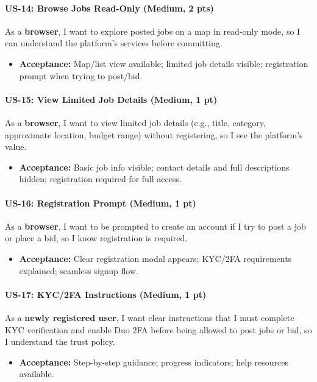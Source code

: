 \documentclass[11pt]{article}
\begin{document}
\paragraph{US-14: Browse Jobs Read-Only (Medium, 2 pts)}
As a \textbf{browser}, I want to explore posted jobs on a map in read-only mode, so I can understand the platform's services before committing.
\begin{itemize}[leftmargin=1.4em]
  \item \textbf{Acceptance:} Map/list view available; limited job details visible; registration prompt when trying to post/bid.
\end{itemize}

\paragraph{US-15: View Limited Job Details (Medium, 1 pt)}
As a \textbf{browser}, I want to view limited job details (e.g., title, category, approximate location, budget range) without registering, so I see the platform's value.
\begin{itemize}[leftmargin=1.4em]
  \item \textbf{Acceptance:} Basic job info visible; contact details and full descriptions hidden; registration required for full access.
\end{itemize}

\paragraph{US-16: Registration Prompt (Medium, 1 pt)}
As a \textbf{browser}, I want to be prompted to create an account if I try to post a job or place a bid, so I know registration is required.
\begin{itemize}[leftmargin=1.4em]
  \item \textbf{Acceptance:} Clear registration modal appears; KYC/2FA requirements explained; seamless signup flow.
\end{itemize}

\paragraph{US-17: KYC/2FA Instructions (Medium, 1 pt)}
As a \textbf{newly registered user}, I want clear instructions that I must complete KYC verification and enable Duo 2FA before being allowed to post jobs or bid, so I understand the trust policy.
\begin{itemize}[leftmargin=1.4em]
  \item \textbf{Acceptance:} Step-by-step guidance; progress indicators; help resources available.
\end{itemize}
\end{document}
